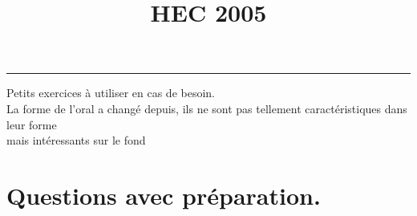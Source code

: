 \documentclass[11pt]{article}%
\title{\bf \vspace{-1.6cm} HEC 2005} %
\author{} %
\date{} %
\begin{document}
\maketitle %
\vspace{-1.2cm}\hrule %
\thispagestyle{fancy}

\vspace*{.2cm}


\begin{center} 
  Petits exercices à utiliser en cas de besoin. \\ La forme de l'oral
  a changé depuis, ils ne sont pas tellement caractéristiques dans
  leur forme \\ mais intéressants sur le fond 
\end{center}

\section*{\textbf{Questions avec préparation.}}
\end{document}
